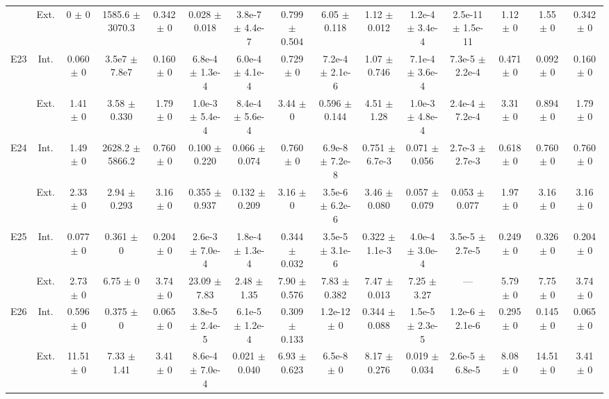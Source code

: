 \begin{table}[htbp]
{\begin{tabular}{@{}ccccccccccccccc@{}}
 & Ext. & 0 $\pm$ 0 & 1585.6 $\pm$ 3070.3 & 0.342 $\pm$ 0 & 0.028 $\pm$ 0.018 & 3.8e-7 $\pm$ 4.4e-7 & 0.799 $\pm$ 0.504 & 6.05 $\pm$ 0.118 & 1.12 $\pm$ 0.012 & 1.2e-4 $\pm$ 3.4e-4 & 2.5e-11 $\pm$ 1.5e-11 & 1.12 $\pm$ 0 & 1.55 $\pm$ 0 & 0.342 $\pm$ 0 \\
\cline{2-15}
\multirow{2}{*}{E23} & Int. & 0.060 $\pm$ 0 & 3.5e7 $\pm$ 7.8e7 & 0.160 $\pm$ 0 & 6.8e-4 $\pm$ 1.3e-4 & 6.0e-4 $\pm$ 4.1e-4 & 0.729 $\pm$ 0 & 7.2e-4 $\pm$ 2.1e-6 & 1.07 $\pm$ 0.746 & 7.1e-4 $\pm$ 3.6e-4 & 7.3e-5 $\pm$ 2.2e-4 & 0.471 $\pm$ 0 & 0.092 $\pm$ 0 & 0.160 $\pm$ 0 \\
 & Ext. & 1.41 $\pm$ 0 & 3.58 $\pm$ 0.330 & 1.79 $\pm$ 0 & 1.0e-3 $\pm$ 5.4e-4 & 8.4e-4 $\pm$ 5.6e-4 & 3.44 $\pm$ 0 & 0.596 $\pm$ 0.144 & 4.51 $\pm$ 1.28 & 1.0e-3 $\pm$ 4.8e-4 & 2.4e-4 $\pm$ 7.2e-4 & 3.31 $\pm$ 0 & 0.894 $\pm$ 0 & 1.79 $\pm$ 0 \\
\cline{2-15}
\multirow{2}{*}{E24} & Int. & 1.49 $\pm$ 0 & 2628.2 $\pm$ 5866.2 & 0.760 $\pm$ 0 & 0.100 $\pm$ 0.220 & 0.066 $\pm$ 0.074 & 0.760 $\pm$ 0 & 6.9e-8 $\pm$ 7.2e-8 & 0.751 $\pm$ 6.7e-3 & 0.071 $\pm$ 0.056 & 2.7e-3 $\pm$ 2.7e-3 & 0.618 $\pm$ 0 & 0.760 $\pm$ 0 & 0.760 $\pm$ 0 \\
 & Ext. & 2.33 $\pm$ 0 & 2.94 $\pm$ 0.293 & 3.16 $\pm$ 0 & 0.355 $\pm$ 0.937 & 0.132 $\pm$ 0.209 & 3.16 $\pm$ 0 & 3.5e-6 $\pm$ 6.2e-6 & 3.46 $\pm$ 0.080 & 0.057 $\pm$ 0.079 & 0.053 $\pm$ 0.077 & 1.97 $\pm$ 0 & 3.16 $\pm$ 0 & 3.16 $\pm$ 0 \\
\cline{2-15}
\multirow{2}{*}{E25} & Int. & 0.077 $\pm$ 0 & 0.361 $\pm$ 0 & 0.204 $\pm$ 0 & 2.6e-3 $\pm$ 7.0e-4 & 1.8e-4 $\pm$ 1.3e-4 & 0.344 $\pm$ 0.032 & 3.5e-5 $\pm$ 3.1e-6 & 0.322 $\pm$ 1.1e-3 & 4.0e-4 $\pm$ 3.0e-4 & 3.5e-5 $\pm$ 2.7e-5 & 0.249 $\pm$ 0 & 0.326 $\pm$ 0 & 0.204 $\pm$ 0 \\
 & Ext. & 2.73 $\pm$ 0 & 6.75 $\pm$ 0 & 3.74 $\pm$ 0 & 23.09 $\pm$ 7.83 & 2.48 $\pm$ 1.35 & 7.90 $\pm$ 0.576 & 7.83 $\pm$ 0.382 & 7.47 $\pm$ 0.013 & 7.25 $\pm$ 3.27 & --- & 5.79 $\pm$ 0 & 7.75 $\pm$ 0 & 3.74 $\pm$ 0 \\
\cline{2-15}
\multirow{2}{*}{E26} & Int. & 0.596 $\pm$ 0 & 0.375 $\pm$ 0 & 0.065 $\pm$ 0 & 3.8e-5 $\pm$ 2.4e-5 & 6.1e-5 $\pm$ 1.2e-4 & 0.309 $\pm$ 0.133 & 1.2e-12 $\pm$ 0 & 0.344 $\pm$ 0.088 & 1.5e-5 $\pm$ 2.3e-5 & 1.2e-6 $\pm$ 2.1e-6 & 0.295 $\pm$ 0 & 0.145 $\pm$ 0 & 0.065 $\pm$ 0 \\
 & Ext. & 11.51 $\pm$ 0 & 7.33 $\pm$ 1.41 & 3.41 $\pm$ 0 & 8.6e-4 $\pm$ 7.0e-4 & 0.021 $\pm$ 0.040 & 6.93 $\pm$ 0.623 & 6.5e-8 $\pm$ 0 & 8.17 $\pm$ 0.276 & 0.019 $\pm$ 0.034 & 2.6e-5 $\pm$ 6.8e-5 & 8.08 $\pm$ 0 & 14.51 $\pm$ 0 & 3.41 $\pm$ 0 \\

\end{tabular}}
\end{table}
